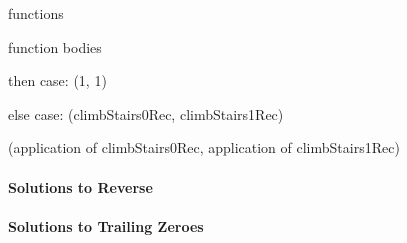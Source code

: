 %

%
functions

function bodies

then case: (1, 1)

else case:
(climbStairs0Rec, climbStairs1Rec)

(application of climbStairs0Rec, application of climbStairs1Rec)

%


\paragraph{Solutions to Reverse}
%

\paragraph{Solutions to Trailing Zeroes}

